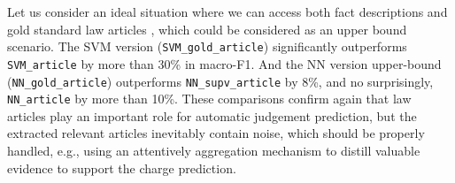 Let us consider an ideal situation where we can access both fact descriptions and gold standard law articles , which could be considered as an upper bound scenario.
The SVM version (\texttt{SVM\_gold\_article}) significantly outperforms %
\texttt{SVM\_article} by more than 30\% in macro-F1.
And the NN version upper-bound (\texttt{NN\_gold\_article}) outperforms 
\texttt{NN\_supv\_article}
by  8\%, and no surprisingly, \texttt{NN\_article} by more than 10\%.
%
These comparisons confirm again that 
law articles play an important role for automatic judgement prediction, but 
the extracted relevant articles inevitably contain noise, which should be properly 
handled, e.g., using an attentively aggregation mechanism to distill 
valuable evidence to support the charge prediction.






